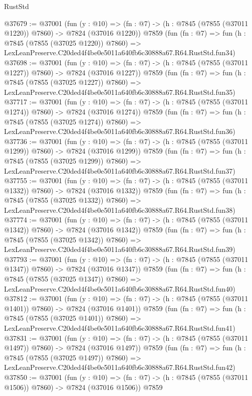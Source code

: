 \begin{lexlean}{RustStd}
\begin{coremodule}
@37679 := @37001
    (fun (y : @10) => (fn : @7) -> (h : @7845 (@7855 (@37011 @1220)) @7860) -> @7824 (@37016 @1220))
    @7859
    (fun (fn : @7) =>
    fun (h : @7845 (@7855 (@37025 @1220)) @7860) =>
    LexLeanPreserve.C20ded4f4be0e5011a640fb6c30888a67.R64.RustStd.fun34)
@37698 := @37001
    (fun (y : @10) => (fn : @7) -> (h : @7845 (@7855 (@37011 @1227)) @7860) -> @7824 (@37016 @1227))
    @7859
    (fun (fn : @7) =>
    fun (h : @7845 (@7855 (@37025 @1227)) @7860) =>
    LexLeanPreserve.C20ded4f4be0e5011a640fb6c30888a67.R64.RustStd.fun35)
@37717 := @37001
    (fun (y : @10) => (fn : @7) -> (h : @7845 (@7855 (@37011 @1274)) @7860) -> @7824 (@37016 @1274))
    @7859
    (fun (fn : @7) =>
    fun (h : @7845 (@7855 (@37025 @1274)) @7860) =>
    LexLeanPreserve.C20ded4f4be0e5011a640fb6c30888a67.R64.RustStd.fun36)
@37736 := @37001
    (fun (y : @10) => (fn : @7) -> (h : @7845 (@7855 (@37011 @1299)) @7860) -> @7824 (@37016 @1299))
    @7859
    (fun (fn : @7) =>
    fun (h : @7845 (@7855 (@37025 @1299)) @7860) =>
    LexLeanPreserve.C20ded4f4be0e5011a640fb6c30888a67.R64.RustStd.fun37)
@37755 := @37001
    (fun (y : @10) => (fn : @7) -> (h : @7845 (@7855 (@37011 @1332)) @7860) -> @7824 (@37016 @1332))
    @7859
    (fun (fn : @7) =>
    fun (h : @7845 (@7855 (@37025 @1332)) @7860) =>
    LexLeanPreserve.C20ded4f4be0e5011a640fb6c30888a67.R64.RustStd.fun38)
@37774 := @37001
    (fun (y : @10) => (fn : @7) -> (h : @7845 (@7855 (@37011 @1342)) @7860) -> @7824 (@37016 @1342))
    @7859
    (fun (fn : @7) =>
    fun (h : @7845 (@7855 (@37025 @1342)) @7860) =>
    LexLeanPreserve.C20ded4f4be0e5011a640fb6c30888a67.R64.RustStd.fun39)
@37793 := @37001
    (fun (y : @10) => (fn : @7) -> (h : @7845 (@7855 (@37011 @1347)) @7860) -> @7824 (@37016 @1347))
    @7859
    (fun (fn : @7) =>
    fun (h : @7845 (@7855 (@37025 @1347)) @7860) =>
    LexLeanPreserve.C20ded4f4be0e5011a640fb6c30888a67.R64.RustStd.fun40)
@37812 := @37001
    (fun (y : @10) => (fn : @7) -> (h : @7845 (@7855 (@37011 @1401)) @7860) -> @7824 (@37016 @1401))
    @7859
    (fun (fn : @7) =>
    fun (h : @7845 (@7855 (@37025 @1401)) @7860) =>
    LexLeanPreserve.C20ded4f4be0e5011a640fb6c30888a67.R64.RustStd.fun41)
@37831 := @37001
    (fun (y : @10) => (fn : @7) -> (h : @7845 (@7855 (@37011 @1497)) @7860) -> @7824 (@37016 @1497))
    @7859
    (fun (fn : @7) =>
    fun (h : @7845 (@7855 (@37025 @1497)) @7860) =>
    LexLeanPreserve.C20ded4f4be0e5011a640fb6c30888a67.R64.RustStd.fun42)
@37850 := @37001
    (fun (y : @10) => (fn : @7) -> (h : @7845 (@7855 (@37011 @1506)) @7860) -> @7824 (@37016 @1506))
    @7859

\end{coremodule}
\end{lexlean}
